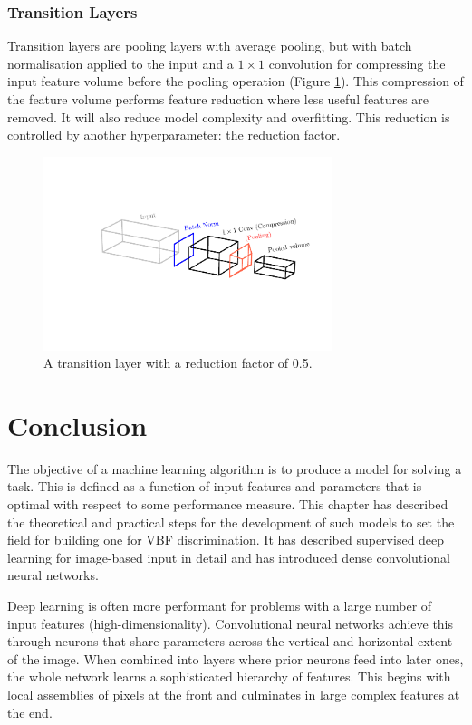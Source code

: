 \subsubsection{Transition Layers}
Transition layers are pooling layers with average pooling, but with batch normalisation applied to the input and a $1\times{}1$ convolution for compressing the input feature volume before the pooling operation (Figure \ref{fig:machine_learning:transition_layer}). 
This compression of the feature volume performs feature reduction where less useful features are removed. It will also reduce model complexity and overfitting. This reduction is controlled by another hyperparameter: the reduction factor. 
\begin{figure}[h!]
    \centering
    \includegraphics[width=0.75\textwidth]{figures/machine_learning/transition_layer.pdf}
    \caption{A transition layer with a reduction factor of 0.5.}
        \label{fig:machine_learning:transition_layer}
\end{figure}




\section{Conclusion}
The objective of a machine learning algorithm is to produce a model for solving a task. 
This is defined as a function of input features and parameters that is optimal with respect to some performance measure. 
This chapter has described the theoretical and practical steps for the development of such models to set the field for building one for VBF discrimination.  
It has described supervised deep learning for image-based input in detail and has introduced dense convolutional neural networks.

Deep learning is often more performant for problems with a large number of input features (high-dimensionality). 
Convolutional neural networks achieve this through neurons that share parameters across the vertical and horizontal extent of the image.  
When combined into layers where prior neurons feed into later ones, the whole network learns a sophisticated hierarchy of features. 
This begins with local assemblies of pixels at the front and culminates in large complex features at the end. 

